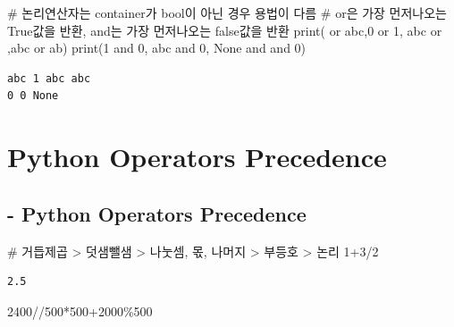 \documentclass[
  a4paper,
  DIV=11,
  numbers=noendperiod]{scrreprt}
\newenvironment{Shaded}{\begin{snugshade}}{\end{snugshade}}
\newcommand{\BuiltInTok}[1]{\textcolor[rgb]{0.00,0.23,0.31}{#1}}
\newcommand{\CommentTok}[1]{\textcolor[rgb]{0.37,0.37,0.37}{#1}}
\newcommand{\DecValTok}[1]{\textcolor[rgb]{0.68,0.00,0.00}{#1}}
\newcommand{\KeywordTok}[1]{\textcolor[rgb]{0.00,0.23,0.31}{#1}}
\newcommand{\NormalTok}[1]{\textcolor[rgb]{0.00,0.23,0.31}{#1}}
\newcommand{\OperatorTok}[1]{\textcolor[rgb]{0.37,0.37,0.37}{#1}}
\newcommand{\StringTok}[1]{\textcolor[rgb]{0.13,0.47,0.30}{#1}}
\newcommand{\VariableTok}[1]{\textcolor[rgb]{0.07,0.07,0.07}{#1}}
\begin{document}
\begin{Shaded}
\begin{Highlighting}[]
\CommentTok{\# 논리연산자는 container가 bool이 아닌 경우 용법이 다름}
\CommentTok{\# or은 가장 먼저나오는 True값을 반환, and는 가장 먼저나오는 false값을 반환}
\BuiltInTok{print}\NormalTok{(}\StringTok{\textquotesingle{}\textquotesingle{}} \KeywordTok{or} \StringTok{\textquotesingle{}abc\textquotesingle{}}\NormalTok{,}\DecValTok{0} \KeywordTok{or} \DecValTok{1}\NormalTok{, }\StringTok{\textquotesingle{}abc\textquotesingle{}} \KeywordTok{or} \StringTok{\textquotesingle{}\textquotesingle{}}\NormalTok{,}\StringTok{\textquotesingle{}abc\textquotesingle{}} \KeywordTok{or} \StringTok{\textquotesingle{}ab\textquotesingle{}}\NormalTok{)}
\BuiltInTok{print}\NormalTok{(}\DecValTok{1} \KeywordTok{and} \DecValTok{0}\NormalTok{, }\StringTok{\textquotesingle{}abc\textquotesingle{}} \KeywordTok{and} \DecValTok{0}\NormalTok{, }\VariableTok{None} \KeywordTok{and} \StringTok{\textquotesingle{}\textquotesingle{}} \KeywordTok{and} \DecValTok{0}\NormalTok{)}
\end{Highlighting}
\end{Shaded}

\begin{verbatim}
abc 1 abc abc
0 0 None
\end{verbatim}

\section{Python Operators Precedence}\label{python-operators-precedence}

\subsection{- Python Operators
Precedence}\label{python-operators-precedence-1}

\begin{Shaded}
\begin{Highlighting}[]
\CommentTok{\# 거듭제곱 \textgreater{} 덧샘뺄샘 \textgreater{} 나눗셈, 몫, 나머지 \textgreater{} 부등호 \textgreater{} 논리}
\DecValTok{1}\OperatorTok{+}\DecValTok{3}\OperatorTok{/}\DecValTok{2}
\end{Highlighting}
\end{Shaded}

\begin{verbatim}
2.5
\end{verbatim}

\begin{Shaded}
\begin{Highlighting}[]
\DecValTok{2400}\OperatorTok{//}\DecValTok{500}\OperatorTok{*}\DecValTok{500}\OperatorTok{+}\DecValTok{2000}\OperatorTok{\%}\DecValTok{500}
\end{Highlighting}
\end{Shaded}
\end{document}
